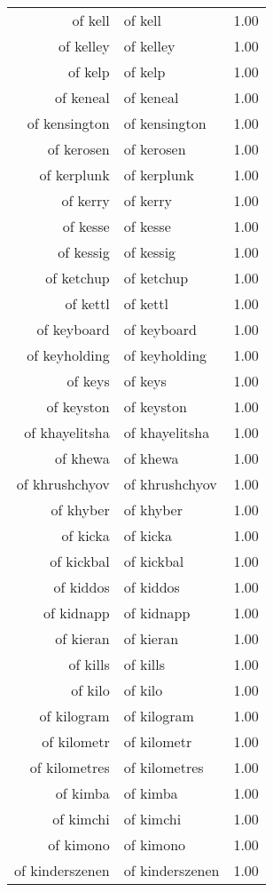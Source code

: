 \begin{table}[ht]
\begin{tabular}{rlr}
  of kell & of kell & 1.00 \\ 
  of kelley & of kelley & 1.00 \\ 
  of kelp & of kelp & 1.00 \\ 
  of keneal & of keneal & 1.00 \\ 
  of kensington & of kensington & 1.00 \\ 
  of kerosen & of kerosen & 1.00 \\ 
  of kerplunk & of kerplunk & 1.00 \\ 
  of kerry & of kerry & 1.00 \\ 
  of kesse & of kesse & 1.00 \\ 
  of kessig & of kessig & 1.00 \\ 
  of ketchup & of ketchup & 1.00 \\ 
  of kettl & of kettl & 1.00 \\ 
  of keyboard & of keyboard & 1.00 \\ 
  of keyholding & of keyholding & 1.00 \\ 
  of keys & of keys & 1.00 \\ 
  of keyston & of keyston & 1.00 \\ 
  of khayelitsha & of khayelitsha & 1.00 \\ 
  of khewa & of khewa & 1.00 \\ 
  of khrushchyov & of khrushchyov & 1.00 \\ 
  of khyber & of khyber & 1.00 \\ 
  of kicka & of kicka & 1.00 \\ 
  of kickbal & of kickbal & 1.00 \\ 
  of kiddos & of kiddos & 1.00 \\ 
  of kidnapp & of kidnapp & 1.00 \\ 
  of kieran & of kieran & 1.00 \\ 
  of kills & of kills & 1.00 \\ 
  of kilo & of kilo & 1.00 \\ 
  of kilogram & of kilogram & 1.00 \\ 
  of kilometr & of kilometr & 1.00 \\ 
  of kilometres & of kilometres & 1.00 \\ 
  of kimba & of kimba & 1.00 \\ 
  of kimchi & of kimchi & 1.00 \\ 
  of kimono & of kimono & 1.00 \\ 
  of kinderszenen & of kinderszenen & 1.00 \\ 

\end{tabular}
\end{table}
